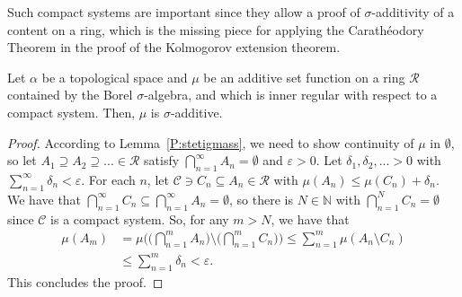 \documentclass[lean]{DraftAFM}
\begin{document}
\noindent
Such compact systems are important since they allow a
proof of $\sigma$-additivity of a content on a ring, which is the
missing piece for applying the Carathéodory Theorem in the proof of
the Kolmogorov extension theorem.

\begin{lemma}\label{l:stetigcompact}
  Let $\alpha$ be a topological space and $\mu$ be an additive set
  function on a ring $\mathcal R$ contained by the Borel
  $\sigma$-algebra, and which is inner regular with respect to a
  compact system. Then, $\mu$ is $\sigma$-additive.
\end{lemma}

\begin{proof}
  According to Lemma~\ref{P:stetigmass}, we need to show continuity of
  $\mu$ in $\emptyset$, so let $A_1 \supseteq A_2 \supseteq... \in
  \mathcal R$ satisfy $\bigcap_{n=1}^\infty A_n = \emptyset$ and
  $\varepsilon>0$. Let $\delta_1, \delta_2,... >0$ with
  $\sum_{n=1}^\infty \delta_n < \varepsilon$. For each $n$, let
  $\mathcal C \ni C_n \subseteq A_n \in \mathcal R$ with $\mu(A_n)
  \leq \mu(C_n) + \delta_n$. We have that $\bigcap_{n=1}^\infty C_n
  \subseteq \bigcap_{n=1}^\infty A_n = \emptyset$, so there is $N \in
  \mathbb N$ with $\bigcap_{n=1}^N C_n = \emptyset$ since $\mathcal C$
  is a compact system. So, for any $m>N$, we have that
  \begin{align*}
     \mu(A_m) & = \mu\Big( \Big(\bigcap_{n=1}^m A_n\Big) \setminus
     \Big(\bigcap_{n=1}^m C_n\Big)\Big) \leq \sum_{n=1}^m \mu(A_n
     \setminus C_n) \\ & \leq \sum_{n=1}^m \delta_n < \varepsilon.
  \end{align*}
  This concludes the proof.
\end{proof}



\end{document}
